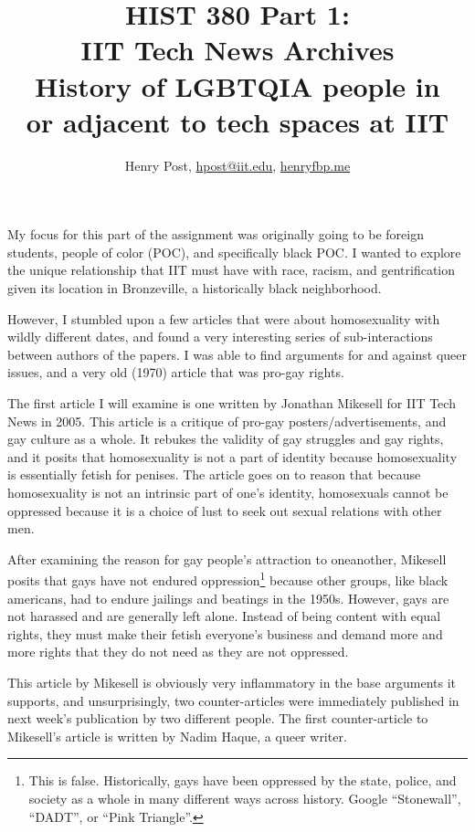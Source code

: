 \documentclass[a4paper,12pt]{article}
\title{HIST 380 Part 1: \\ IIT Tech News Archives \\ History of LGBTQIA people in \\ or adjacent to tech spaces at IIT}
\author{Henry Post, \url{hpost@iit.edu}, \url{henryfbp.me}}
\begin{document}
\maketitle

\newpage

	My focus for this part of the assignment was originally going to be foreign students, people of color (POC), and specifically black POC. I wanted to explore the unique relationship that IIT must have with race, racism, and gentrification given its location in Bronzeville, a historically black neighborhood. 

	However, I stumbled upon a few articles that were about homosexuality with wildly different dates, and found a very interesting series of sub-interactions between authors of the papers. I was able to find arguments for and against queer issues, and a very old (1970) article that was pro-gay rights.

	The first article \cite{antigay} I will examine is one written by Jonathan Mikesell for IIT Tech News in 2005. This article is a critique of pro-gay posters/advertisements, and gay culture as a whole. It rebukes the validity of gay struggles and gay rights, and it posits that homosexuality is not a part of identity because homosexuality is essentially fetish for penises. The article goes on to reason that because homosexuality is not an intrinsic part of one's identity, homosexuals cannot be oppressed because it is a choice of lust to seek out sexual relations with other men.

	After examining the reason for gay people's attraction to oneanother, Mikesell posits that gays have not endured oppression\footnote{This is false. Historically, gays have been oppressed by the state, police, and society as a whole in many different ways across history. Google ``Stonewall'', ``DADT'', or ``Pink Triangle''.} because other groups, like black americans, had to endure jailings and beatings in the 1950s. However, gays are not harassed and are generally left alone. Instead of being content with equal rights, they must make their fetish everyone's business and demand more and more rights that they do not need as they are not oppressed.
	
	This article by Mikesell is obviously very inflammatory in the base arguments it supports, and unsurprisingly, two counter-articles were immediately published in next week's publication by two different people.  The first counter-article to Mikesell's article is written by Nadim Haque\cite{counterantigay1}, a queer writer. 
	
\end{document}
